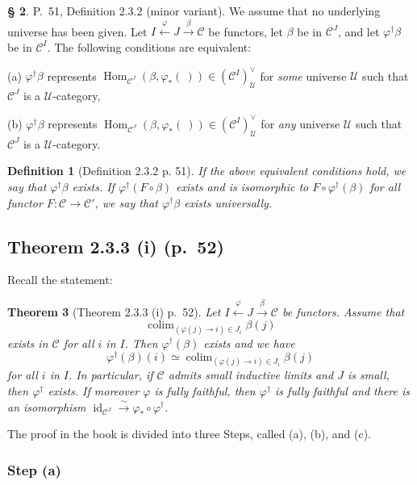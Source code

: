 \documentclass[12pt]{article}
\newtheorem{thm}{Theorem}
\newtheorem{df}[thm]{Definition}
\theoremstyle{remark}
\theoremstyle{definition}
\newtheorem{s}[thm]{\S}
\newcommand{\nn}{\noindent}
\newcommand{\C}{\mathcal C}
\newcommand{\U}{\mathcal U}
\newcommand{\pp}{\varphi}
\newcommand{\xr}{\xrightarrow}
\DeclareMathOperator*{\colim}{colim}
\DeclareMathOperator{\id}{id}
\DeclareMathOperator{\Hom}{Hom}
\begin{document}
\begin{s} 
P.~51, Definition 2.3.2 (minor variant). We assume that no underlying universe has been given. Let $I\xleftarrow\pp J\xr\beta\C$ be functors, let $\beta$ be in $\C^J$, and let $\pp^\dagger\beta$ be in $\C^I$. The following conditions are equivalent:

\nn(a) $\pp^\dagger\beta$ represents $\Hom_{\C^J}(\beta,\pp_*(\ ))\in(\C^I)^\vee_\U$ for \emph{some} universe $\U$ such that $\C^J$ is a $\U$-category,

\nn(b) $\pp^\dagger\beta$ represents $\Hom_{\C^J}(\beta,\pp_*(\ ))\in(\C^I)^\vee_\U$ for \emph{any} universe $\U$ such that $\C^J$ is a $\U$-category. 

\begin{df}[Definition 2.3.2 p. 51]\label{232} 
If the above equivalent conditions hold, we say that $\pp^\dagger\beta$ {\em exists}. If $\pp^\dagger(F\circ\beta)$ exists and is isomorphic to $F\circ\pp^\dagger(\beta)$ for all functor $F:\C\to\C'$, we say that $\pp^\dagger\beta$ exists {\em universally}.
\end{df}
\end{s}


\subsection{Theorem 2.3.3 (i) (p.~52)}

Recall the statement: 

\begin{thm}[Theorem 2.3.3 (i) p.~52]\label{233i}
Let $I\xleftarrow\pp J\xr\beta\C$ be functors. Assume that 
$$
\colim_{(\pp(j)\to i)\in J_i}\beta(j)
$$ 
exists in $\C$ for all $i$ in $I$. Then $\pp^\dagger(\beta)$ exists and we have 
%
\begin{equation}\label{236}
\pp^\dagger(\beta)(i)\simeq\colim_{(\pp(j)\to i)\in J_i}\beta(j)
\end{equation} 
%
for all $i$ in $I$. In particular, if $\C$ admits small inductive limits and $J$ is small, then 
$\pp^\dagger$ exists. If moreover $\pp$ is fully faithful, then $\pp^\dagger$ is fully faithful and there is an isomorphism $\id_{\C^J}\xr\sim\pp_*\circ\pp^\dagger$. 
\end{thm}
The proof in the book is divided into three Steps, called (a), (b), and (c). 

%

\subsubsection{Step (a)}\label{scji}
\end{document}
